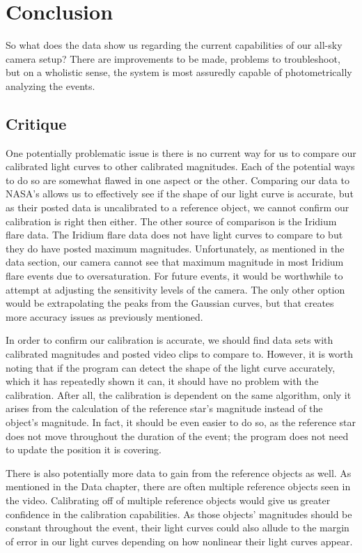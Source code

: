 \chapter{Conclusion}

So what does the data show us regarding the current capabilities of our all-sky camera setup? There are improvements to be made, problems to troubleshoot, but on a wholistic sense, the system is most assuredly capable of photometrically analyzing the events.

\section{Critique}
One potentially problematic issue is there is no current way for us to compare our calibrated light curves to other calibrated magnitudes. Each of the potential ways to do so are somewhat flawed in one aspect or the other. Comparing our data to NASA's allows us to effectively see if the shape of our light curve is accurate, but as their posted data is uncalibrated to a reference object, we cannot confirm our calibration is right then either. The other source of comparison is the Iridium flare data. The Iridium flare data does not have light curves to compare to but they do have posted maximum magnitudes. Unfortunately, as mentioned in the data section, our camera cannot see that maximum magnitude in most Iridium flare events due to oversaturation. For future events, it would be worthwhile to attempt at adjusting the sensitivity levels of the camera. The only other option would be extrapolating the peaks from the Gaussian curves, but that creates more accuracy issues as previously mentioned.

In order to confirm our calibration is accurate, we should find data sets with calibrated magnitudes and posted video clips to compare to. However, it is worth noting that if the program can detect the shape of the light curve accurately, which it has repeatedly shown it can, it should have no problem with the calibration. After all, the calibration is dependent on the same algorithm, only it arises from the calculation of the reference star's magnitude instead of the object's magnitude. In fact, it should be even easier to do so, as the reference star does not move throughout the duration of the event; the program does not need to update the position it is covering. 

There is also potentially more data to gain from the reference objects as well. As mentioned in the Data chapter, there are often multiple reference objects seen in the video. Calibrating off of multiple reference objects would give us greater confidence in the calibration capabilities. As those objects' magnitudes should be constant throughout the event, their light curves could also allude to the margin of error in our light curves depending on how nonlinear their light curves appear.


